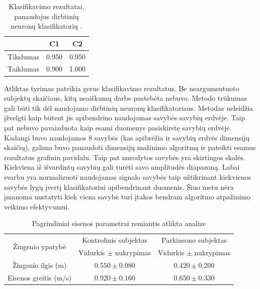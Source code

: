 \documentclass[]{vgtuef}
\begin{document}
\begin{table}
  \centering
  \renewcommand{\arraystretch}{1.3}
  \caption{Klasifikavimo rezultatai, panaudojus dirbtinių neuronų klasifikatorių \cite{vgtu}.}
  \label{table:vgtu_ann_scores}
  \begin{tabular}{|c|c|c|} \hline
    & C1 & C2 \\ \hline
    Tikslumas & 0.950 & 0.950 \\ \hline
    Taiklumas & 0.900 & 1.000 \\ \hline
  \end{tabular}
\end{table}

Atliktas tyrimas pateikia gerus klasifikavimo rezultatus. Be neargumentuoto subjektų skaičiaus, kitų neaiškumų darbe pastebėta nebuvo. Metodo trūkumas gali būti tik dėl naudojamo dirbtinių neuronų klasifikatoriaus. Metodas neleidžia įžvelgti kaip būtent jis apibendrino naudojamas savybės savybių erdvėje. Taip pat nebuvo pavaizduota kaip esami duomenys pasiskirstę savybių erdvėje. Kadangi buvo naudojamos 8 savybės (kas apibrėžia ir savybių erdvės dimensijų skaičių), galima buvo panaudoti dimensijų mažinimo algoritmą ir pateikti esamus rezultatus grafiniu pavidalu. Taip pat nurodytos savybės yra skirtingos skalės. Kiekviena iš išvardintų savybių gali turėti savo amplitudės diapazoną. Labai svarbu yra normalizuoti naudojamas signalo savybės taip užtikrinant kiekvienos savybės lygų įvertį klasifikatoriui apibendrinant duomenis. Šiuo metu nėra įmanoma nustatyti kiek viena savybė turi įtakos bendram algoritmo atpažinimo veikimo efektyvumui.


\begin{table}
	\centering
	\renewcommand{\arraystretch}{1.3}
	\caption{Pagrindiniai eisenos parametrai remiantis atlikta analize \cite{6151536}}
	\label{table:statistics_st_wa}
	\begin{tabular}{|c|c|c|} \hline
		\multirow{2}{*}{Žingsnio ypatybė} & Kontrolinis subjektas & Parkinsono subjektas \\ \cline{2-3}
			& Vidurkis $\pm$ nukrypimas & Vidurkis $\pm$ nukrypimas \\ \hline
		Žingsnio ilgis (m) & $0.550\pm0.080$ & $0.420\pm0.200$ \\ \hline
		Eisenos greitis (m/s) & $0.920\pm0.160$ & $0.650\pm0.330$ \\ \hline
	\end{tabular}
\end{table}
\end{document}
